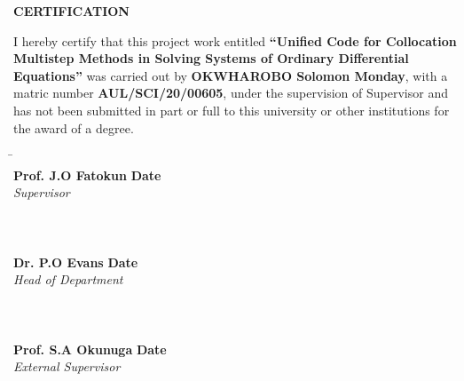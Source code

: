 \documentclass[a4paper, twoside]{report} %
\begin{document}
\begin{titlepage}
  \begin{center}
    \textbf{\huge CERTIFICATION}
\end{center}

\vspace{1cm}

\noindent
I hereby certify that this project work entitled \textbf{“Unified Code for Collocation Multistep Methods in Solving Systems of Ordinary Differential Equations”} was carried out by \textbf{OKWHAROBO Solomon Monday}, with a matric number \textbf{AUL/SCI/20/00605}, under the supervision of Supervisor and has not been submitted in part or full to this university or other institutions for the award of a degree.

\vfill

\noindent
\begin{tabbing}
    \hspace{8cm} \= \hspace{8cm} \kill
    \makebox[6cm]{\hrulefill} \> \makebox[6cm]{\hrulefill} \\
    \textbf{Prof. J.O Fatokun} \> \textbf{Date} \\
    \textit{Supervisor} \\
    \\
    \\
    \makebox[6cm]{\hrulefill} \> \makebox[6cm]{\hrulefill} \\
    \textbf{Dr. P.O Evans} \> \textbf{Date} \\
    \textit{Head of Department} \\
    \\
    \\
    \makebox[6cm]{\hrulefill} \> \makebox[6cm]{\hrulefill} \\
    \textbf{Prof. S.A Okunuga} \> \textbf{Date} \\
    \textit{External Supervisor} \\
\end{tabbing}
\end{titlepage}
\end{document}
